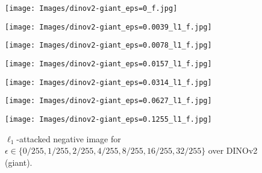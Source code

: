 \documentclass[12pt]{article}
\begin{document}
\begin{figure}[ht]
  \vspace{10pt}
  \begin{minipage}{0.125\textwidth}
    \texttt{[image: Images/dinov2-giant\_eps=0\_f.jpg]}
  \end{minipage}
  \hfill
  \begin{minipage}{0.125\textwidth}
    \texttt{[image: Images/dinov2-giant\_eps=0.0039\_l1\_f.jpg]}
  \end{minipage}
  \hfill
  \begin{minipage}{0.125\textwidth}
    \texttt{[image: Images/dinov2-giant\_eps=0.0078\_l1\_f.jpg]}
  \end{minipage}
  \hfill
  \begin{minipage}{0.125\textwidth}
    \texttt{[image: Images/dinov2-giant\_eps=0.0157\_l1\_f.jpg]}
  \end{minipage}
  \hfill
  \begin{minipage}{0.125\textwidth}
    \texttt{[image: Images/dinov2-giant\_eps=0.0314\_l1\_f.jpg]}
  \end{minipage}
  \hfill
  \begin{minipage}{0.125\textwidth}
    \texttt{[image: Images/dinov2-giant\_eps=0.0627\_l1\_f.jpg]}
  \end{minipage}
  \hfill
  \begin{minipage}{0.125\textwidth}
    \texttt{[image: Images/dinov2-giant\_eps=0.1255\_l1\_f.jpg]}
  \end{minipage}
  \label{fig:dino_l1_negative_examples}
  \caption{$\ell_1$-attacked negative image for $\epsilon \in \{0/255, 1/255, 2/255, 4/255, 8/255, 16/255, 32/255\}$ over DINOv2 (giant).}
\end{figure}
\end{document}
